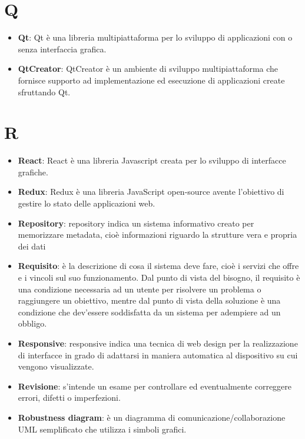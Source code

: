 \documentclass[a4paper, oneside, openany]{article}
\begin{document}
\section{Q}
\begin{itemize}
\item \textbf{Qt}: Qt è una libreria multipiattaforma per lo sviluppo di applicazioni con o senza interfaccia grafica.
\item \textbf{QtCreator}: QtCreator è un ambiente di sviluppo multipiattaforma che fornisce supporto ad implementazione ed esecuzione di applicazioni create sfruttando Qt.
\end{itemize}

\section{R}
\begin{itemize}
\item \textbf{React}: React è una libreria Javascript creata per lo sviluppo di interfacce grafiche.
\item \textbf{Redux}: Redux è una libreria JavaScript open-source avente l'obiettivo di gestire lo stato delle applicazioni web.
\item \textbf{Repository}: repository indica un sistema informativo creato per memorizzare metadata, cioè informazioni riguardo la strutture vera e propria dei dati
\item \textbf{Requisito}: è la descrizione di cosa il sistema deve fare, cioè i servizi che offre e i vincoli sul suo funzionamento. Dal punto di vista del bisogno, il requisito è una condizione necessaria ad un utente per risolvere un problema o raggiungere un obiettivo, mentre dal punto di vista della soluzione è una condizione che dev'essere soddisfatta da un sistema per adempiere ad un obbligo.
\item \textbf{Responsive}: responsive indica una tecnica di web design per la realizzazione di interfacce in grado di adattarsi in maniera automatica al dispositivo su cui vengono visualizzate.
\item \textbf{Revisione}: s'intende un esame per controllare ed eventualmente correggere errori, difetti o imperfezioni.
\item \textbf{Robustness diagram}: è un diagramma di comunicazione/collaborazione UML semplificato che utilizza i simboli grafici.
\end{itemize}
\end{document}
